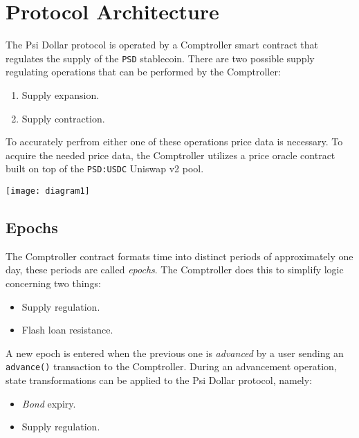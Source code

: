 \documentclass[a4paper, 12pt]{article}
\begin{document}
	\section{Protocol Architecture}
	The Psi Dollar protocol is operated by a Comptroller smart contract that regulates the supply of the \texttt{PSD} stablecoin. There are two possible supply regulating operations that can be performed by the Comptroller:

	\begin{enumerate}

		\item{Supply expansion.}
		\item{Supply contraction.}

	\end{enumerate}

	To accurately perfrom either one of these operations price data is necessary. To acquire the needed price data, the Comptroller utilizes a price oracle contract built on top of the \texttt{PSD:USDC} Uniswap v2 pool. 
	
	\begin{center}

		\texttt{[image: diagram1]}

	\end{center}

	\newpage

	\subsection{Epochs}
	The Comptroller contract formats time into distinct periods of approximately one day, these periods are called \textit{epochs}.  The Comptroller does this to simplify logic concerning two things:
	
	\begin{itemize}

		\item{Supply regulation.}
		\item{Flash loan resistance.}

	\end{itemize}
	
	A new epoch is entered when the previous one is \textit{advanced} by a user sending an \texttt{advance()} transaction to the Comptroller. During an advancement operation, state transformations 			can be applied to the Psi Dollar protocol, namely:

	\begin{itemize}

		\item{\textit{Bond} expiry.}
		\item{Supply regulation.}

	\end{itemize}
\end{document}
